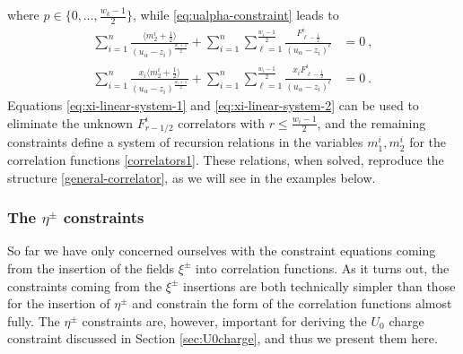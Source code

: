 \documentclass[a4paper,11pt]{article}
\numberwithin{equation}{section}
\begin{document}
where $p\in\{0,\ldots,\frac{w_k-1}{2}\}$, while \eqref{eq:ualpha-constraint} leads to 
\begin{equation}
\begin{split}
\sum_{i=1}^{n}\frac{\bigl\langle m_2^i+\tfrac{1}{2}\bigr\rangle}{(u_{\alpha}-z_i)^{\frac{w_i+1}{2}}}+\sum_{i=1}^{n}\sum_{\ell=1}^{\frac{w_i-1}{2}}\frac{F^i_{\ell-\frac{1}{2}}}{(u_{\alpha}-z_i)^{\ell}}&=0\ ,\\
\sum_{i=1}^{n}\frac{x_i\bigl\langle m_2^i+\tfrac{1}{2}\bigr\rangle}{(u_{\alpha}-z_i)^{\frac{w_i+1}{2}}}+\sum_{i=1}^{n}\sum_{\ell=1}^{\frac{w_i-1}{2}}\frac{x_i F^i_{\ell-\frac{1}{2}}}{(u_{\alpha}-z_i)^{\ell}}&=0\ .
\end{split}
\label{eq:xi-linear-system-2}
\end{equation}
Equations \eqref{eq:xi-linear-system-1} and \eqref{eq:xi-linear-system-2} can be used to eliminate the unknown $F^i_{r-1/2}$ correlators with $r\leq\frac{w_i-1}{2}$, and the remaining  constraints define a system of recursion relations in the variables $m_1^i,m_2^i$ for the correlation functions \eqref{correlators1}. These relations, when solved, reproduce the structure \eqref{general-correlator}, as we will see in the examples below.

\subsubsection[The \texorpdfstring{$\eta^{\pm}$}{eta} constraints]{\boldmath The \texorpdfstring{$\eta^{\pm}$}{eta} constraints}\label{etaconstraints}

So far we have only concerned ourselves with the constraint equations coming from the insertion of the fields $\xi^{\pm}$ into correlation functions. As it turns out, the constraints coming from the $\xi^{\pm}$ insertions are both technically simpler than those for the insertion of $\eta^{\pm}$ and constrain the form of the correlation functions almost fully. The $\eta^{\pm}$ constraints are, however, important for deriving the $U_0$ charge constraint discussed in Section \ref{sec:U0charge}, and thus we present them here.
\end{document}
